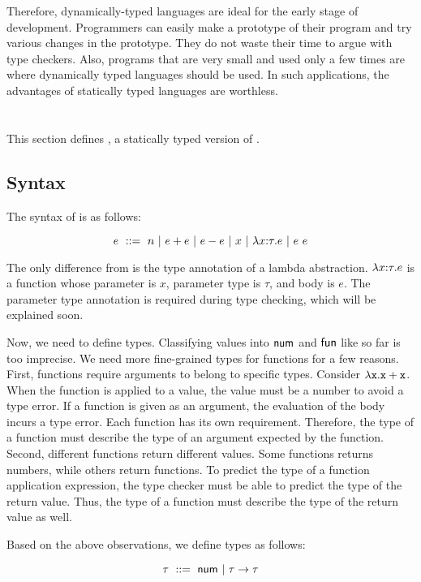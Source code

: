 Therefore, dynamically-typed languages are ideal for the early stage of
development. Programmers can easily make a prototype of their program and try
various changes in the prototype. They do not waste their time to argue with type
checkers. Also, programs that are very small and used only a few times are where
dynamically typed languages should be used. In such applications, the advantages
of statically typed languages are worthless.

\section{\lang}

This section defines \lang, a statically typed version of \plang.

\subsection{Syntax}

The syntax of \lang is as follows:

\[
e\ ::=\ n
\ |\ e + e
\ |\ e - e
\ |\ x
\ |\ \lambda x{:}\tau.e
\ |\ e\ e
\]

The only difference from \plang is the type annotation of a lambda abstraction.
$\lambda x{:}\tau.e$ is a function whose parameter is $x$, parameter type is
$\tau$, and body is $e$. The parameter type annotation is required during
type checking, which will be explained soon.

Now, we need to define types. Classifying values into $\textsf{num}$ and $\textsf{fun}$ like so
far is too imprecise. We need more fine-grained types for functions for a few
reasons. First, functions require arguments to belong to specific types.
Consider $\lambda\texttt{x}.\texttt{x}+\texttt{x}$. When the function is applied to a value, the
value must be a number to avoid a type error. If a function is given as an
argument, the evaluation of the body incurs a type error. Each function has its
own requirement. Therefore, the type of a function must describe the type of an
argument expected by the function. Second, different functions return different
values. Some functions returns numbers, while others return functions. To
predict the type of a function application expression, the type checker must be
able to predict the type of the return value. Thus, the type of a function must
describe the type of the return value as well.

Based on the above observations, we define types as follows:

\[
\tau\ ::=\ \tnum\ |\ \tarrow{\tau}{\tau}
\]

